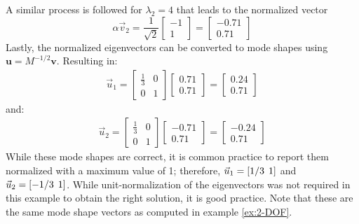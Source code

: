 \documentclass[12pt,letter]{article}
\begin{document}
\begin{example}
A similar process is followed for $\lambda_2=4$ that leads to the normalized vector 
\begin{equation}
\alpha \vec{v}_2=  \frac{1}{\sqrt{2}} \begin{bmatrix} -1 \\ 1 \end{bmatrix} =  \begin{bmatrix} -0.71 \\ 0.71 \end{bmatrix} 
\end{equation} 
Lastly, the normalized eigenvectors can be converted to mode shapes using $\textbf{u} = M^{-1/2}\textbf{v}$. Resulting in: 
\begin{eqnarray}
\vec{u}_1 =  \begin{bmatrix} \frac{1}{3} & 0  \\  0 & 1 \end{bmatrix}   \begin{bmatrix} 0.71 \\ 0.71 \end{bmatrix} =  \begin{bmatrix} 0.24 \\  0.71 \end{bmatrix}
\end{eqnarray}
and:
\begin{eqnarray}
\vec{u}_2 =  \begin{bmatrix} \frac{1}{3} & 0  \\  0 & 1 \end{bmatrix}   \begin{bmatrix} -0.71 \\  0.71 \end{bmatrix} =  \begin{bmatrix} -0.24 \\  0.71 \end{bmatrix}
\end{eqnarray}
While these mode shapes are correct, it is common practice to report them normalized with a maximum value of 1; therefore, $\vec{u}_1 = [1/3 \hspace{1ex} 1]$ and $\vec{u}_2 = [-1/3 \hspace{1ex} 1]$. While unit-normalization of the eigenvectors was not required in this example to obtain the right solution, it is good practice. Note that these are the same mode shape vectors as computed in example \ref{ex:2-DOF}.

\end{example}
\end{document}
